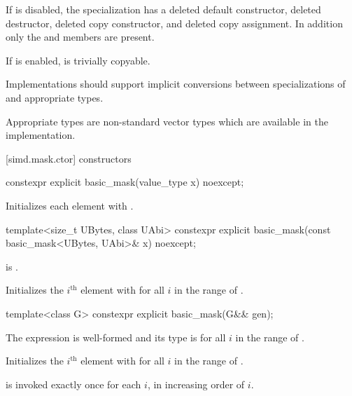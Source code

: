If  is disabled, the specialization has a
deleted default constructor, deleted destructor, deleted copy constructor, and
deleted copy assignment.
In addition only the  and  members are
present.

If  is enabled,
 is trivially copyable.

\pnum
\recommended Implementations should support implicit conversions between
specializations of  and appropriate  types.
\begin{note}
Appropriate types are non-standard vector types which are available in the
implementation.
\end{note}

[simd.mask.ctor]{ constructors}

\begin{itemdecl}
constexpr explicit basic_mask(value_type x) noexcept;
\end{itemdecl}

\begin{itemdescr}
\pnum
\effects
Initializes each element with .
\end{itemdescr}

\begin{itemdecl}
template<size_t UBytes, class UAbi>
  constexpr explicit basic_mask(const basic_mask<UBytes, UAbi>& x) noexcept;
\end{itemdecl}

\begin{itemdescr}
\pnum
\constraints
{} is
.

\pnum
\effects
Initializes the $i^\text{th}$ element with  for all $i$ in the
range of .
\end{itemdescr}

\begin{itemdecl}
template<class G> constexpr explicit basic_mask(G&& gen);
\end{itemdecl}

\begin{itemdescr}
\pnum
\constraints
The expression  is
well-formed and its type is  for all $i$ in the range of
.

\pnum
\effects
Initializes the $i^\text{th}$ element with
 for all $i$ in
the range of .

\pnum
\remarks
{} is invoked exactly once for each $i$, in increasing order of $i$.
\end{itemdescr}

